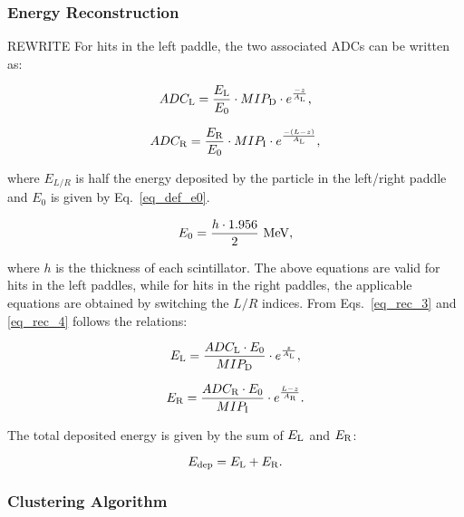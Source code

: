 \subsubsection{Energy Reconstruction}
{\color{red} REWRITE 
For hits in the left paddle, the two associated ADCs can be written as:

\begin{equation}
\label{eq_rec_3}
ADC_{\rm{L}}=\frac{E_{\rm{L}}}{E_0}\cdot MIP_{\rm{D}}\cdot e^{\frac{-z}{A_{\rm{L}}}},
\end{equation}

\begin{equation}
\label{eq_rec_4}
ADC_{\rm{R}}=\frac{E_{\rm{R}}}{E_0}\cdot MIP_{\rm{I}}\cdot e^{\frac{-(L-z)}{A_{\rm{L}}}},
\end{equation}

\noindent
where $E_{L/R}$ is half the energy deposited by the particle in the left/right paddle and $E_0$ is given by
Eq.~\ref{eq_def_e0}.

\begin{equation}\label{eq_def_e0}
E_0=\frac{h\cdot 1.956}{2}~\rm{MeV},
\end{equation}

\noindent
where $h$ is the thickness of each scintillator. The above equations are valid for hits in the left paddles, while
for hits in the right paddles, the applicable equations are obtained by switching the $L/R$ indices. From
Eqs.~\ref{eq_rec_3} and \ref{eq_rec_4} follows the relations:

\begin{equation}
E_{\rm{L}}=\frac{ADC_{\rm{L}} \cdot E_0}{MIP_{\rm{D}}}\cdot e^{\frac{z}{A_{\rm{L}}}},
\end{equation}

\begin{equation}
E_{\rm{R}}=\frac{ADC_{\rm{R}} \cdot E_0}{MIP_{\rm{I}}}\cdot e^{\frac{L-z}{A_{\rm{R}}}}.
\end{equation}

\noindent
The total deposited energy is given by the sum of $E_{\rm{L}}$ and $E_{\rm{R}}$:

\begin{equation}
E_{\rm{dep}}=E_{\rm{L}}+E_{\rm{R}}.
\end{equation}

}

\subsubsection{Clustering Algorithm}

